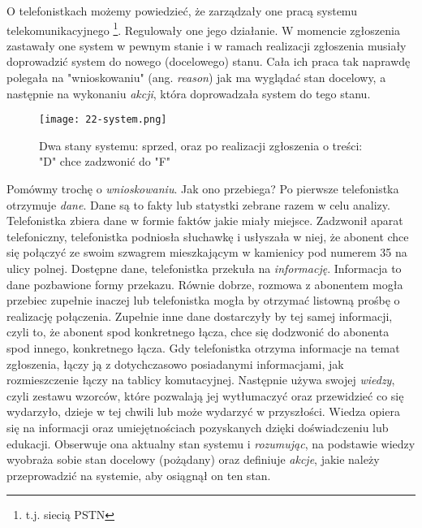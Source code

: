 O telefonistkach możemy powiedzieć, że zarządzały one pracą systemu telekomunikacyjnego \footnote{t.j. siecią PSTN}. Regulowały one jego działanie. W momencie zgłoszenia zastawały one system w pewnym stanie i w ramach realizacji zgłoszenia musiały doprowadzić system do nowego (docelowego) stanu. Cała ich praca tak naprawdę polegała na "wnioskowaniu" (ang. \textit{reason}) jak ma wyglądać stan docelowy, a następnie na wykonaniu \textit{akcji}, która doprowadzała system do tego stanu. 

\begin{figure}[!h]
    \centering \texttt{[image: 22-system.png]}
    \caption{Dwa stany systemu: sprzed, oraz po realizacji zgłoszenia o treści: "D" chce zadzwonić do "F"}\label{fig:}
\end{figure}

Pomówmy trochę o \textit{wnioskowaniu}. Jak ono przebiega? Po pierwsze telefonistka otrzymuje \textit{dane}. Dane są to fakty lub statystki zebrane razem w celu analizy. Telefonistka zbiera dane w formie faktów jakie miały miejsce. Zadzwonił aparat telefoniczny, telefonistka podniosła słuchawkę i usłyszała w niej, że abonent chce się połączyć ze swoim szwagrem mieszkającym w kamienicy pod numerem 35 na ulicy polnej. Dostępne dane, telefonistka przekuła na \textit{informację}. Informacja to dane pozbawione formy przekazu. Równie dobrze, rozmowa z abonentem mogła przebiec zupełnie inaczej lub telefonistka mogła by otrzymać listowną prośbę o realizację połączenia. Zupełnie inne dane dostarczyły by tej samej informacji, czyli to, że abonent spod konkretnego łącza, chce się dodzwonić do abonenta spod innego, konkretnego łącza. Gdy telefonistka otrzyma informacje na temat zgłoszenia, łączy ją z dotychczasowo posiadanymi informacjami, jak rozmieszczenie łączy na tablicy komutacyjnej. Następnie używa swojej \textit{wiedzy}, czyli zestawu wzorców, które pozwalają jej wytłumaczyć oraz przewidzieć co się wydarzyło, dzieje w tej chwili lub może wydarzyć w przyszłości. Wiedza opiera się na informacji oraz umiejętnościach pozyskanych dzięki doświadczeniu lub edukacji.  Obserwuje ona aktualny stan systemu i \textit{rozumując}, na podstawie wiedzy wyobraża sobie stan docelowy (pożądany) oraz definiuje \textit{akcje}, jakie należy przeprowadzić na systemie, aby osiągnął on ten stan. 


